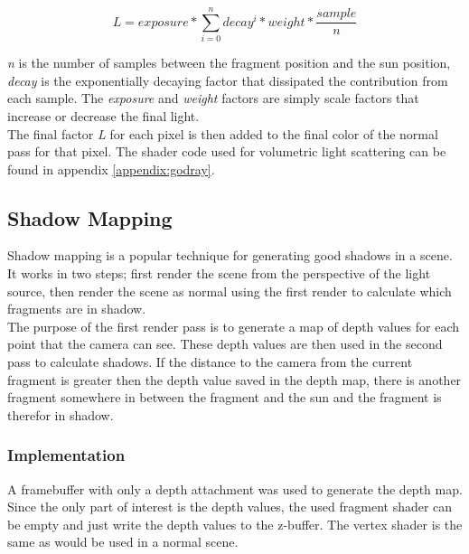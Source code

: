 \documentclass{article}
\begin{document}
  			\begin{equation}
  				\label{eq:godray}
  				L = exposure * \sum_{i = 0}^{n} decay^i * weight * \frac{sample}{n}
  			\end{equation}
  			
  			\textit{n} is the number of samples between the fragment position and the sun position, \textit{decay} is the exponentially decaying factor that dissipated the contribution from each sample. The \textit{exposure} and \textit{weight} factors are simply scale factors that increase or decrease the final light. \\
  			
  			The final factor \textit{L} for each pixel is then added to the final color of the normal pass for that pixel. The shader code used for volumetric light scattering can be found in appendix \ref{appendix:godray}.
  		
  		\subsection{Shadow Mapping}
  			Shadow mapping is a popular technique for generating good shadows in a scene. It works in two steps; first render the scene from the perspective of the light source, then render the scene as normal using the first render to calculate which fragments are in shadow. \citep{ragnemalm2015so} \\
  			
  			The purpose of the first render pass is to generate a map of depth values for each point that the camera can see. These depth values are then used in the second pass to calculate shadows. If the distance to the camera from the current fragment is greater then the depth value saved in the depth map, there is another fragment somewhere in between the fragment and the sun and the fragment is therefor in shadow. \citep{ragnemalm2015so}
  			
  			\subsubsection*{Implementation}
  				
  				A framebuffer with only a depth attachment was used to generate the depth map. Since the only part of interest is the depth values, the used fragment shader can be empty and just write the depth values to the z-buffer. The vertex shader is the same as would be used in a normal scene. \\
  				
\end{document}
